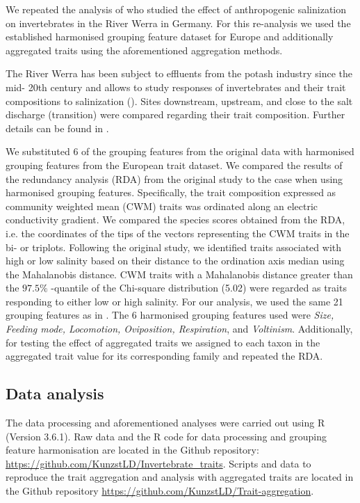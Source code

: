 \documentclass{article}
\begin{document}
We repeated the analysis of \citet{szocs_effects_2014} who studied the effect of anthropogenic salinization on invertebrates in the River Werra in Germany. For this re-analysis we used the established harmonised grouping feature dataset for Europe and additionally aggregated traits using the aforementioned aggregation methods. 

The River Werra has been subject to effluents from the potash industry since the mid- 20th century and allows to study responses of invertebrates and their trait compositions to salinization (\cite{bathe_biological_2011}). Sites downstream, upstream, and close to the salt discharge (transition) were compared regarding their trait composition. Further details can be found in \citet{szocs_effects_2014}. 

We substituted 6 of the grouping features from the original data with harmonised grouping features from the European trait dataset. We compared the results of the redundancy analysis (RDA) from the original study to the case when using harmonised grouping features. Specifically, the trait composition expressed as community weighted mean (CWM) traits was ordinated along an electric conductivity gradient. We compared the species scores obtained from the RDA, i.e. the coordinates of the tips of the vectors representing the CWM traits in the bi- or triplots. Following the original study, we identified traits associated with high or low salinity based on their distance to the ordination axis median using the Mahalanobis distance. CWM traits with a Mahalanobis distance greater than the $97.5 \%$ -quantile of the Chi-square distribution (5.02) were regarded as traits responding to either low or high salinity. For our analysis, we used the same 21 grouping features as in \citet{szocs_effects_2014}. The 6 harmonised grouping features used were \textit{Size, Feeding mode, Locomotion, Oviposition, Respiration}, and \textit{Voltinism}. Additionally, for testing the effect of aggregated traits we assigned to each taxon in \citet{szocs_effects_2014} the aggregated trait value for its corresponding family and repeated the RDA.  


\subsection*{Data analysis}

The data processing and aforementioned analyses were carried out using R (Version 3.6.1). Raw data and the R code for data processing and grouping feature harmonisation are located in the Github repository: \url{https://github.com/KunzstLD/Invertebrate_traits}. Scripts and data to reproduce the trait aggregation and analysis with aggregated traits are located in the Github repository \url{https://github.com/KunzstLD/Trait-aggregation}.
\end{document}
